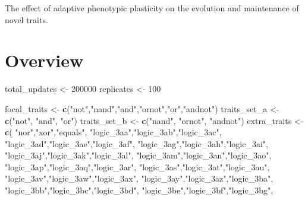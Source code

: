 \documentclass[]{book}
\newenvironment{Shaded}{\begin{snugshade}}{\end{snugshade}}
\newcommand{\DecValTok}[1]{\textcolor[rgb]{0.00,0.00,0.81}{#1}}
\newcommand{\KeywordTok}[1]{\textcolor[rgb]{0.13,0.29,0.53}{\textbf{#1}}}
\newcommand{\NormalTok}[1]{#1}
\newcommand{\StringTok}[1]{\textcolor[rgb]{0.31,0.60,0.02}{#1}}
\begin{document}
The effect of adaptive phenotypic plasticity on the evolution and maintenance of novel traits.

\hypertarget{overview-2}{%
\section{Overview}\label{overview-2}}

\begin{Shaded}
\begin{Highlighting}[]
\NormalTok{total_updates <-}\StringTok{ }\DecValTok{200000}
\NormalTok{replicates <-}\StringTok{ }\DecValTok{100}

\NormalTok{focal_traits <-}\StringTok{ }\KeywordTok{c}\NormalTok{(}\StringTok{"not"}\NormalTok{,}\StringTok{"nand"}\NormalTok{,}\StringTok{"and"}\NormalTok{,}\StringTok{"ornot"}\NormalTok{,}\StringTok{"or"}\NormalTok{,}\StringTok{"andnot"}\NormalTok{)}
\NormalTok{traits_set_a <-}\StringTok{ }\KeywordTok{c}\NormalTok{(}\StringTok{"not"}\NormalTok{, }\StringTok{"and"}\NormalTok{, }\StringTok{"or"}\NormalTok{)}
\NormalTok{traits_set_b <-}\StringTok{ }\KeywordTok{c}\NormalTok{(}\StringTok{"nand"}\NormalTok{, }\StringTok{"ornot"}\NormalTok{, }\StringTok{"andnot"}\NormalTok{)}
\NormalTok{extra_traits <-}\StringTok{ }\KeywordTok{c}\NormalTok{(}
  \StringTok{"nor"}\NormalTok{,}\StringTok{"xor"}\NormalTok{,}\StringTok{"equals"}\NormalTok{,}
  \StringTok{"logic_3aa"}\NormalTok{,}\StringTok{"logic_3ab"}\NormalTok{,}\StringTok{"logic_3ac"}\NormalTok{,}
  \StringTok{"logic_3ad"}\NormalTok{,}\StringTok{"logic_3ae"}\NormalTok{,}\StringTok{"logic_3af"}\NormalTok{,}
  \StringTok{"logic_3ag"}\NormalTok{,}\StringTok{"logic_3ah"}\NormalTok{,}\StringTok{"logic_3ai"}\NormalTok{,}
  \StringTok{"logic_3aj"}\NormalTok{,}\StringTok{"logic_3ak"}\NormalTok{,}\StringTok{"logic_3al"}\NormalTok{,}
  \StringTok{"logic_3am"}\NormalTok{,}\StringTok{"logic_3an"}\NormalTok{,}\StringTok{"logic_3ao"}\NormalTok{,}
  \StringTok{"logic_3ap"}\NormalTok{,}\StringTok{"logic_3aq"}\NormalTok{,}\StringTok{"logic_3ar"}\NormalTok{,}
  \StringTok{"logic_3as"}\NormalTok{,}\StringTok{"logic_3at"}\NormalTok{,}\StringTok{"logic_3au"}\NormalTok{,}
  \StringTok{"logic_3av"}\NormalTok{,}\StringTok{"logic_3aw"}\NormalTok{,}\StringTok{"logic_3ax"}\NormalTok{,}
  \StringTok{"logic_3ay"}\NormalTok{,}\StringTok{"logic_3az"}\NormalTok{,}\StringTok{"logic_3ba"}\NormalTok{,}
  \StringTok{"logic_3bb"}\NormalTok{,}\StringTok{"logic_3bc"}\NormalTok{,}\StringTok{"logic_3bd"}\NormalTok{,}
  \StringTok{"logic_3be"}\NormalTok{,}\StringTok{"logic_3bf"}\NormalTok{,}\StringTok{"logic_3bg"}\NormalTok{,}

\end{Highlighting}
\end{Shaded}
\end{document}
